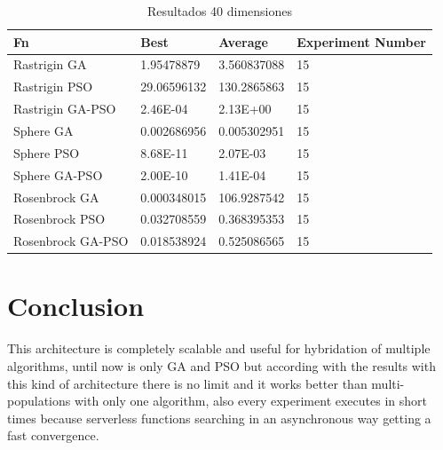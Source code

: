 \documentclass[runningheads]{llncs}
\begin{document}

            \begin{table}[htp]
              \caption{Resultados 40 dimensiones}
              \label{table:resultados-2}
              \centering
              \begin{tabular}{|l|l|l|l|}
              \hline
              Fn & Best & Average & Experiment Number \\
              \hline
              \hline
              Rastrigin GA & 1.95478879 & 3.560837088 & 15\\
              \hline
              Rastrigin PSO & 29.06596132 & 130.2865863 & 15\\
              \hline
              Rastrigin GA-PSO & 2.46E-04 & 2.13E+00 & 15\\
              \hline
              Sphere GA & 0.002686956 & 0.005302951 & 15\\
              \hline
              Sphere PSO & 8.68E-11 & 2.07E-03 & 15\\
              \hline
              Sphere GA-PSO & 2.00E-10 & 1.41E-04 & 15\\
              \hline
              Rosenbrock GA & 0.000348015 & 106.9287542 & 15\\
              \hline
              Rosenbrock PSO & 0.032708559 & 0.368395353 & 15\\
              \hline
              Rosenbrock GA-PSO & 0.018538924 & 0.525086565 & 15\\
              \hline
              \end{tabular}
              \end{table}
%
%
% 
% 
%
\section{Conclusion}

This architecture is completely scalable and useful for hybridation of multiple algorithms,
until now is only GA and PSO but according with the results with this kind of architecture
there is no limit and it works better than multi-populations with only one algorithm, also
every experiment executes in short times because serverless functions searching in an asynchronous way getting a fast convergence.
\end{document}

